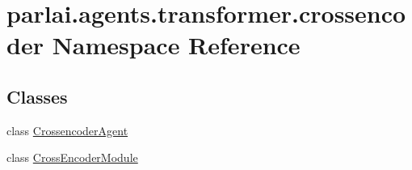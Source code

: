 \hypertarget{namespaceparlai_1_1agents_1_1transformer_1_1crossencoder}{}\section{parlai.\+agents.\+transformer.\+crossencoder Namespace Reference}
\label{namespaceparlai_1_1agents_1_1transformer_1_1crossencoder}
\subsection*{Classes}
\begin{DoxyCompactItemize}
\item 
class \hyperlink{classparlai_1_1agents_1_1transformer_1_1crossencoder_1_1CrossencoderAgent}{Crossencoder\+Agent}
\item 
class \hyperlink{classparlai_1_1agents_1_1transformer_1_1crossencoder_1_1CrossEncoderModule}{Cross\+Encoder\+Module}
\end{DoxyCompactItemize}

